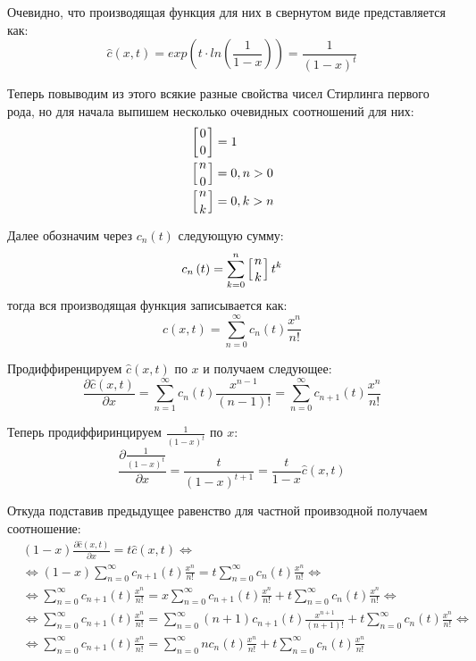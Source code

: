 Очевидно, что производящая функция для них в свернутом виде представляется как:
\[
	\hat c\left(x,t\right) = exp\left(t\cdot ln\left(\frac{1}{1-x}\right)\right) = \frac{1}{\left(1-x\right)^t}
\]

Теперь повыводим из этого всякие разные свойства чисел Стирлинга первого рода, но для начала выпишем несколько очевидных соотношений для них:
\[
	\begin{split}
		& \left[0\atop 0\right] = 1\\
		& \left[n\atop 0\right] = 0, n > 0\\
		& \left[n\atop k\right] = 0, k > n
	\end{split}
\]

Далее обозначим через $c_n\left(t\right)$ следующую сумму:
\[
	c_n\left(t\right) = \sum_{k=0}^{n} \left[n\atop k\right] t^k
\]
тогда вся производящая функция записывается как:
\[
	\hat c\left(x,t\right) = \sum_{n=0}^{\infty} c_n\left(t\right) \frac{x^n}{n!}
\]

Продиффиренцируем $\hat c\left(x,t\right)$ по $x$ и получаем следующее:
\[
	\frac{\partial \hat c \left(x,t\right)}{\partial x} = \sum_{n=1}^{\infty} c_n\left(t\right) \frac{x^{n-1}}{\left(n-1\right)!} = \sum_{n=0}^{\infty} c_{n+1}\left(t\right) \frac{x^n}{n!}
\]

Теперь продиффиринцируем $\frac{1}{\left(1-x\right)^t}$ по $x$:
\[
	\frac{\partial \frac{1}{\left(1-x\right)^t}}{\partial x} = \frac{t}{\left(1-x\right)^{t+1}} = \frac{t}{1-x} \hat c\left(x,t\right)
\]

Откуда подставив предыдущее равенство для частной проивзодной получаем соотношение:
\[
	\begin{split}
		& \left(1-x\right) \frac{\partial \hat c\left(x,t\right)}{\partial x} = t\hat c\left(x,t\right) \Leftrightarrow\\
		& \Leftrightarrow \left(1-x\right)\sum_{n=0}^{\infty} c_{n+1}\left(t\right) \frac{x^n}{n!} = t\sum_{n=0}^{\infty}c_n\left(t\right)\frac{x^n}{n!} \Leftrightarrow\\
		& \Leftrightarrow \sum_{n=0}^{\infty}c_{n+1}\left(t\right) \frac{x^n}{n!} = x\sum_{n=0}^{\infty} c_{n+1}\left(t\right)\frac{x^n}{n!} + t \sum_{n=0}^{\infty}c_n\left(t\right)\frac{x^n}{n!} \Leftrightarrow\\
		& \Leftrightarrow \sum_{n=0}^{\infty}c_{n+1}\left(t\right) \frac{x^n}{n!} = \sum_{n=0}^{\infty} \left(n+1\right) c_{n+1}\left(t\right) \frac{x^{n+1}}{\left(n+1\right)!} + t \sum_{n=0}^{\infty} c_n\left(t\right) \frac{x^n}{n!} \Leftrightarrow\\
		& \Leftrightarrow \sum_{n=0}^{\infty}c_{n+1}\left(t\right) \frac{x^n}{n!} = \sum_{n=0}^{\infty} n c_n\left(t\right)\frac{x^n}{n!} + t\sum_{n=0}^{\infty} c_n\left(t\right) \frac{x^n}{n!}
	\end{split}
\]

